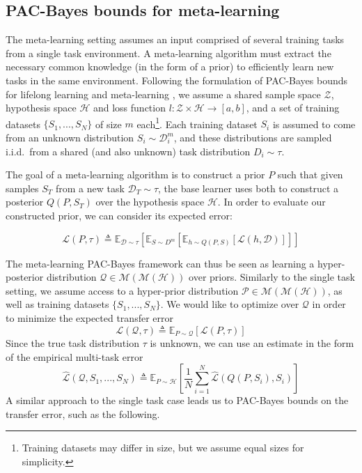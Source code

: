 \documentclass{article}
\theoremstyle{definition}
\newcommand{\Expect}[2]{\mathbb{E}_{#1}\left [#2 \right ]}
\begin{document}
\subsection{PAC-Bayes bounds for meta-learning} \label{sec:meta}

The meta-learning setting assumes an input comprised of several training tasks from a single task environment. A meta-learning algorithm must extract the necessary common knowledge (in the form of a prior) to efficiently learn new tasks in the same environment. Following the formulation of PAC-Bayes bounds for lifelong learning \citep{Pentina2014} and meta-learning \citep{Amit2018}, we assume a shared sample space $\mathcal{Z}$, hypothesis space $\mathcal{H}$ and loss function $l:\mathcal{Z}\times \mathcal{H}\rightarrow [a,b]$, and a set of training datasets $\{S_1,...,S_N\}$ of size $m$ each\footnote{Training datasets may differ in size, but we assume equal sizes for simplicity.}. Each training dataset $S_i$ is assumed to come from an unknown distribution $S_i\sim \mathcal{D}^m_i$, and these distributions are sampled i.i.d.\ from a shared (and also unknown) task distribution $D_i\sim \tau$.

The goal of a meta-learning algorithm is to construct a prior $P$ such that given samples $S_T$ from a new task $\mathcal{D}_T\sim \tau$, the base learner uses both to construct a posterior $Q(P, S_T)$ over the hypothesis space $\mathcal{H}$. In order to evaluate our constructed prior, we can consider its expected error:

\begin{equation}
\mathcal{L}(P, \tau)\triangleq \Expect{\mathcal{D}\sim \tau}{\Expect{S\sim D^m}{\Expect{h\sim Q(P, S)}{\mathcal{L}(h, \mathcal{D})}}}
\end{equation}

The meta-learning PAC-Bayes framework can thus be seen as learning a hyper-posterior distribution $\mathcal{Q}\in \mathcal{M}(\mathcal{M}(\mathcal{H}))$ over priors. Similarly to the single task setting, we assume access to a hyper-prior distribution $\mathcal{P}\in \mathcal{M}(\mathcal{M}(\mathcal{H}))$, as well as training datasets $\{S_1,...,S_N\}$.
We would like to optimize over $\mathcal{Q}$ in order to minimize the expected transfer error $$\mathcal{L}(\mathcal{Q}, \tau) \triangleq \Expect{P\sim \mathcal{Q}}{\mathcal{L}(P, \tau)}$$
Since the true task distribution $\tau$ is unknown, we can use an estimate in the form of the empirical multi-task error $$\hat{\mathcal{L}}(\mathcal{Q}, S_1,...,S_N)\triangleq \Expect{P\sim \mathcal{H}}{\frac{1}{N}\sum_{i=1}^{N}\hat{\mathcal{L}}(Q(P, S_i), S_i)}$$
A similar approach to the single task case leads us to PAC-Bayes bounds on the transfer error, such as the following.
\end{document}
